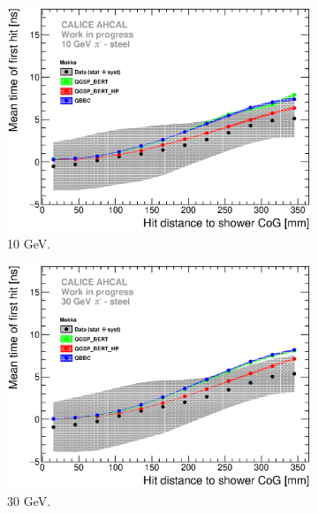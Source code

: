 \begin{figure}[htbp!]
  \begin{subfigure}[t]{0.49\textwidth}
    \centering
    \includegraphics[width=1\textwidth]{../Thesis_Plots/Timing/Pions/Plots/ComparisonToSim/Time_Radius_10GeV_BL_Mokka.eps}
    \caption{10 GeV.} \label{fig:Radius_BL_SimData_10GeV}
  \end{subfigure}
  \hfill
  \begin{subfigure}[t]{0.49\textwidth}
    \centering
    \includegraphics[width=1\textwidth]{../Thesis_Plots/Timing/Pions/Plots/ComparisonToSim/Time_Radius_30GeV_BL_Mokka.eps}
    \caption{30 GeV.} \label{fig:Radius_BL_SimData_30GeV}
  \end{subfigure}
  \hfill
  \begin{subfigure}[t]{0.49\textwidth}

\end{subfigure}
\end{figure}
